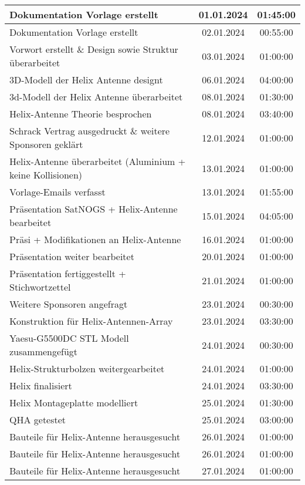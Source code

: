 \begin{longtable}{|l|c|c|}
	\hline
	Dokumentation Vorlage erstellt & 01.01.2024 & 01:45:00 \\
	\hline
	Dokumentation Vorlage erstellt & 02.01.2024 & 00:55:00 \\
	\hline
	Vorwort erstellt \& Design sowie Struktur überarbeitet & 03.01.2024 & 01:00:00 \\
	\hline
	3D-Modell der Helix Antenne designt & 06.01.2024 & 04:00:00 \\
	\hline
	3d-Modell der Helix Antenne überarbeitet & 08.01.2024 & 01:30:00 \\
	\hline
	Helix-Antenne Theorie besprochen & 08.01.2024 & 03:40:00 \\
	\hline
	Schrack Vertrag ausgedruckt \& weitere Sponsoren geklärt & 12.01.2024 & 01:00:00 \\
	\hline
	Helix-Antenne überarbeitet (Aluminium + keine Kollisionen) & 13.01.2024 & 01:00:00 \\
	\hline
	Vorlage-Emails verfasst & 13.01.2024 & 01:55:00 \\
	\hline
	Präsentation SatNOGS + Helix-Antenne bearbeitet & 15.01.2024 & 04:05:00 \\
	\hline
	Präsi + Modifikationen an Helix-Antenne & 16.01.2024 & 01:00:00 \\
	\hline
	Präsentation weiter bearbeitet & 20.01.2024 & 01:00:00 \\
	\hline
	Präsentation fertiggestellt + Stichwortzettel & 21.01.2024 & 01:00:00 \\
	\hline
	Weitere Sponsoren angefragt & 23.01.2024 & 00:30:00 \\
	\hline
	Konstruktion für Helix-Antennen-Array & 23.01.2024 & 03:30:00 \\
	\hline
	Yaesu-G5500DC STL Modell zusammengefügt & 24.01.2024 & 00:30:00 \\
	\hline
	Helix-Strukturbolzen weitergearbeitet & 24.01.2024 & 01:00:00 \\
	\hline
	Helix finalisiert & 24.01.2024 & 03:30:00 \\
	\hline
	Helix Montageplatte modelliert & 25.01.2024 & 01:30:00 \\
	\hline
	QHA getestet & 25.01.2024 & 03:00:00 \\
	\hline
	Bauteile für Helix-Antenne herausgesucht & 26.01.2024 & 01:00:00 \\
	\hline
	Bauteile für Helix-Antenne herausgesucht & 26.01.2024 & 01:00:00 \\
	\hline
	Bauteile für Helix-Antenne herausgesucht & 27.01.2024 & 01:00:00 \\

\end{longtable}
